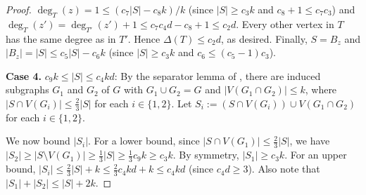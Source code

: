 \begin{proof}
$\deg_T(z)=1 \leq ( c_7 |S| - c_8 k)/k$ (since $|S|\geq c_3k$ and $c_8+1 \leq c_7 c_3  $) and $\deg_{T}(z') = \deg_{T'}(z')+1\leq c_7 c_4d - c_8 + 1  \leq c_2d$. Every other vertex in $T$ has the same degree as in $T'$. Hence $\Delta(T)\leq c_2d$, as desired. Finally, $S=B_z$ and $|B_z|=|S| \leq c_5 |S|-c_6k$ (since $|S|\geq c_3k$ and $c_6 \leq (c_5-1) c_3$).

\textbf{Case 4.} $c_9 k \leq |S|\leq c_4kd$: By the separator lemma of \citet[(2.6)]{RS-II}, there are induced subgraphs $G_1$ and $G_2$ of $G$ with $G_1\cup G_2=G$ and $|V(G_1\cap G_2)|\leq k$, where $|S\cap V(G_i)|\leq \frac23 |S|$ for each $i\in\{1,2\}$. Let $S_i := (S\cap V(G_i))\cup V(G_1\cap G_2)$ for each $i\in\{1,2\}$.

We now bound $|S_i|$. For a lower bound, since $|S\cap V(G_1)|\leq \frac23 |S|$, we have $|S_2|\geq |S\setminus V(G_1)|\geq \frac13 |S| \geq \frac13 c_9k \geq c_3k $. By symmetry, $|S_1|\geq  c_3k $. For an upper bound, $|S_i|\leq\frac23 |S| + k \leq \frac23 c_4kd + k \leq c_4kd$ (since $c_4d\geq 3$). Also note that $|S_1|+|S_2|\leq |S|+2k$.


\end{proof}
